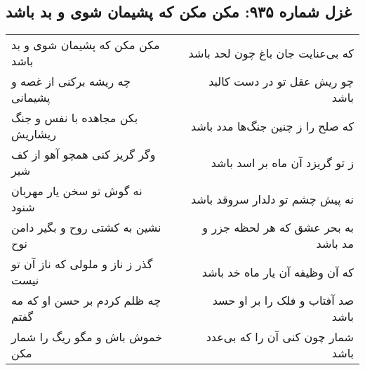 \begin{center}
\section*{غزل شماره ۹۳۵: مکن مکن که پشیمان شوی و بد باشد}
\label{sec:0935}
\begin{longtable}{l p{0.5cm} r}
مکن مکن که پشیمان شوی و بد باشد
&&
که بی‌عنایت جان باغ چون لحد باشد
\\
چه ریشه برکنی از غصه و پشیمانی
&&
چو ریش عقل تو در دست کالبد باشد
\\
بکن مجاهده با نفس و جنگ ریشاریش
&&
که صلح را ز چنین جنگ‌ها مدد باشد
\\
وگر گریز کنی همچو آهو از کف شیر
&&
ز تو گریزد آن ماه بر اسد باشد
\\
نه گوش تو سخن یار مهربان شنود
&&
نه پیش چشم تو دلدار سروقد باشد
\\
نشین به کشتی روح و بگیر دامن نوح
&&
به بحر عشق که هر لحظه جزر و مد باشد
\\
گذر ز ناز و ملولی که ناز آن تو نیست
&&
که آن وظیفه آن یار ماه خد باشد
\\
چه ظلم کردم بر حسن او که مه گفتم
&&
صد آفتاب و فلک را بر او حسد باشد
\\
خموش باش و مگو ریگ را شمار مکن
&&
شمار چون کنی آن را که بی‌عدد باشد
\\
\end{longtable}
\end{center}
